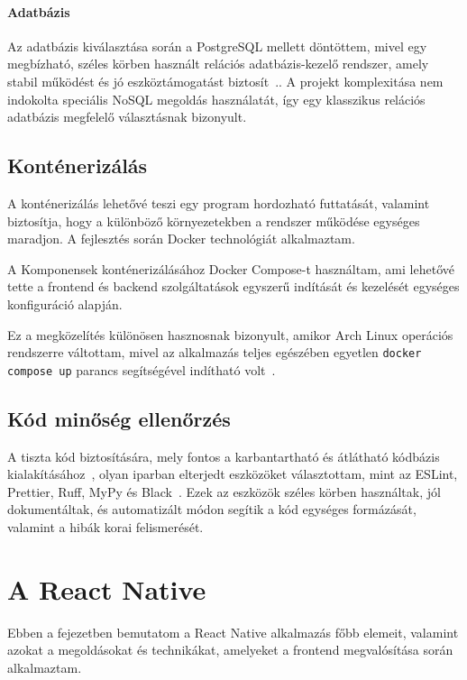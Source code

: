 \documentclass[
]{thesis-ekf}
\theoremstyle{definition}
\theoremstyle{remark}
\begin{document}
\subsubsection{Adatbázis}
Az adatbázis kiválasztása során a PostgreSQL mellett döntöttem, mivel egy megbízható, széles körben használt relációs adatbázis-kezelő rendszer, amely stabil működést és jó eszköztámogatást biztosít~\cite{postgresql}.. A projekt komplexitása nem indokolta speciális NoSQL megoldás használatát, így egy klasszikus relációs adatbázis megfelelő választásnak bizonyult.

\section{Konténerizálás}

A konténerizálás lehetővé teszi egy program hordozható futtatását, valamint biztosítja, hogy a különböző környezetekben a rendszer működése egységes maradjon. A fejlesztés során Docker technológiát alkalmaztam.

A Komponensek konténerizálásához Docker Compose-t használtam, ami lehetővé tette a frontend és backend szolgáltatások egyszerű indítását és kezelését egységes konfiguráció alapján.

Ez a megközelítés különösen hasznosnak bizonyult, amikor Arch Linux operációs rendszerre váltottam, mivel az alkalmazás teljes egészében egyetlen \texttt{docker compose up} parancs segítségével indítható volt~\cite{docker, docker_compose}.

\section{Kód minőség ellenőrzés}

A tiszta kód biztosítására, mely fontos a karbantartható és átlátható kódbázis kialakításához~\cite{martin2008cleancode}, olyan iparban elterjedt eszközöket választottam, mint az ESLint, Prettier, Ruff, MyPy és Black~\cite{eslint, prettier, ruff, mypy, black}. Ezek az eszközök széles körben használtak, jól dokumentáltak, és automatizált módon segítik a kód egységes formázását, valamint a hibák korai felismerését.

\chapter{A React Native}

Ebben a fejezetben bemutatom a React Native alkalmazás főbb elemeit, valamint azokat a megoldásokat és technikákat, amelyeket a frontend megvalósítása során alkalmaztam.
\end{document}
